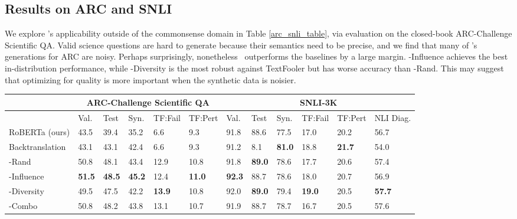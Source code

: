 \documentclass[11pt,a4paper]{article}
\newcommand{\gdaug}{}
\begin{document}
\subsection{Results on ARC and SNLI}

We explore \gdaug's applicability outside of the commonsense domain in Table \ref{arc_snli_table}, via evaluation on the closed-book ARC-Challenge Scientific QA. 
Valid science questions are hard to generate because their semantics need to be precise, and we find that many of \gdaug 's generations for ARC are noisy.
Perhaps surprisingly, nonetheless \gdaug\ outperforms the baselines by a large margin. 
\gdaug-Influence achieves the best in-distribution performance, while \gdaug-Diversity is the most robust against TextFooler but has worse accuracy than \gdaug-Rand. 
This may suggest that optimizing for quality is more important when the synthetic data is noisier.
\begin{table*}[]
\small
\centering
\begin{tabular}{llllll|llllll}
                                & \multicolumn{5}{c}{ARC-Challenge Scientific QA} &  \multicolumn{6}{c}{SNLI-3K}                        \\ \bottomrule
                                & Val.   & Test   & Syn.   & TF:Fail   & TF:Pert  & Val. & Test & Syn. & TF:Fail & TF:Pert & NLI Diag. \\ \toprule
RoBERTa (ours)                         & 43.5   & 39.4   & 35.2   & 6.6       & 9.3      & 91.8 & 88.6 & 77.5 & 17.0    & 20.2    & 56.7      \\
Backtranslation                 & 43.1   & 43.1   & 42.4   & 6.6       & 9.3      & 91.2 & 8.1  & \textbf{81.0} & 18.8    & \textbf{21.7}    & 54.0      \\ \toprule
\gdaug-Rand      & 50.8   & 48.1   & 43.4   & 12.9      & 10.8     & 91.8 & \textbf{89.0} & 78.6 & 17.7    & 20.6    & 57.4      \\
\gdaug-Influence & \textbf{51.5}   & \textbf{48.5}   & \textbf{45.2}   & 12.4      & \textbf{11.0}    & \textbf{92.3} & 88.7 & 78.6 & 18.0    & 20.7    & 56.9      \\
\gdaug-Diversity & 49.5   & 47.5   & 42.2   & \textbf{13.9}      & 10.8     & 92.0 & \textbf{89.0} & 79.4 & \textbf{19.0}    & 20.5    & \textbf{57.7}      \\
\gdaug-Combo     & 50.8   & 48.2   & 43.8   & 13.1      & 10.7     & 91.9 & 88.7 & 78.7 & 16.7    & 20.5    & 57.6     
\end{tabular}
\caption{Results on closed-book ARC-Challenge Scientific QA and SNLI-3K, along with robustness to synonym replacement, TextFooler (TF) attacks and NLI Diagnostics.  \gdaug improves accuracy and robustness. }
\label{arc_snli_table}
\end{table*}
 
\end{document}
